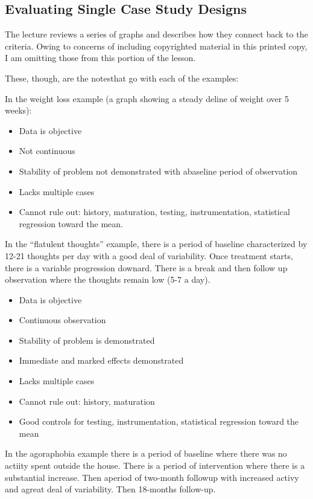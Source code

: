 \documentclass[
  english,
]{book}
\providecommand{\tightlist}{%
  \setlength{\itemsep}{0pt}\setlength{\parskip}{0pt}}
\begin{document}
\hypertarget{evaluating-single-case-study-designs}{%
\subsection{Evaluating Single Case Study Designs}\label{evaluating-single-case-study-designs}}

The lecture reviews a series of graphs and describes how they connect back to the criteria. Owing to concerns of including copyrighted material in this printed copy, I am omitting those from this portion of the lesson.

These, though, are the notesthat go with each of the examples:

In the weight loss example (a graph showing a steady deline of weight over 5 weeks):

\begin{itemize}
\tightlist
\item
  Data is objective
\item
  Not continuous
\item
  Stability of problem not demonstrated with abaseline period of observation
\item
  Lacks multiple cases
\item
  Cannot rule out: history, maturation, testing, instrumentation, statistical regression toward the mean.
\end{itemize}

In the ``flatulent thoughts'' example, there is a period of baseline characterized by 12-21 thoughts per day with a good deal of variability. Once treatment starts, there is a variable progression downard. There is a break and then follow up observation where the thoughts remain low (5-7 a day).

\begin{itemize}
\tightlist
\item
  Data is objective
\item
  Continuous observation
\item
  Stability of problem is demonstrated
\item
  Immediate and marked effects demonstrated
\item
  Lacks multiple cases
\item
  Cannot rule out: history, maturation
\item
  Good controls for testing, instrumentation, statistical regression toward the mean
\end{itemize}

In the agoraphobia example there is a period of baseline where there was no actiity spent outside the house. There is a period of intervention where there is a substantial increase. Then aperiod of two-month followup with increased activy and agreat deal of variability. Then 18-months follow-up.
\end{document}
